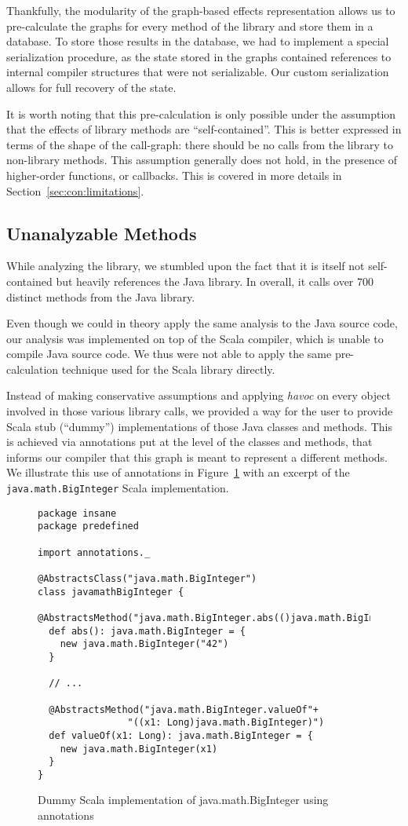 Thankfully, the modularity of the graph-based effects representation allows us
to pre-calculate the graphs for every method of the library and store them in a
database. To store those results in the database, we had to implement a special
serialization procedure, as the state stored in the graphs contained references
to internal compiler structures that were not serializable. Our custom
serialization allows for full recovery of the state.

It is worth noting that this pre-calculation is only possible under the
assumption that the effects of library methods are ``self-contained''. This is
better expressed in terms of the shape of the call-graph: there should be no
calls from the library to non-library methods. This assumption generally does
not hold, in the presence of higher-order functions, or callbacks. This is
covered in more details in Section~\ref{sec:con:limitations}.

\subsection{Unanalyzable Methods}
While analyzing the library, we stumbled upon the fact that it is itself not
self-contained but heavily references the Java library. In overall, it calls
over 700 distinct methods from the Java library.

Even though we could in theory apply the same analysis to the Java source code, our
analysis was implemented on top of the Scala compiler, which is unable to
compile Java source code. We thus were not able to apply the same
pre-calculation technique used for the Scala library directly.

Instead of making conservative assumptions and applying \emph{havoc} on every
object involved in those various library calls, we provided a way for the user
to provide Scala stub (``dummy'') implementations of those Java classes and
methods. This is achieved via annotations put at the level of the classes and
methods, that informs our compiler that this graph is meant to represent a
different methods.  We illustrate this use of annotations in
Figure~\ref{fig:imp:annotations} with an excerpt of the
\lstinline{java.math.BigInteger} Scala implementation.
\begin{figure}[h]
    \centering
\begin{lstlisting}
package insane
package predefined

import annotations._

@AbstractsClass("java.math.BigInteger")
class javamathBigInteger {
  @AbstractsMethod("java.math.BigInteger.abs(()java.math.BigInteger)")
  def abs(): java.math.BigInteger = {
    new java.math.BigInteger("42")
  }

  // ...

  @AbstractsMethod("java.math.BigInteger.valueOf"+
                "((x1: Long)java.math.BigInteger)")
  def valueOf(x1: Long): java.math.BigInteger = {
    new java.math.BigInteger(x1)
  }
}
\end{lstlisting}
    \caption{Dummy Scala implementation of java.math.BigInteger using annotations}
    \label{fig:imp:annotations}
\end{figure}

